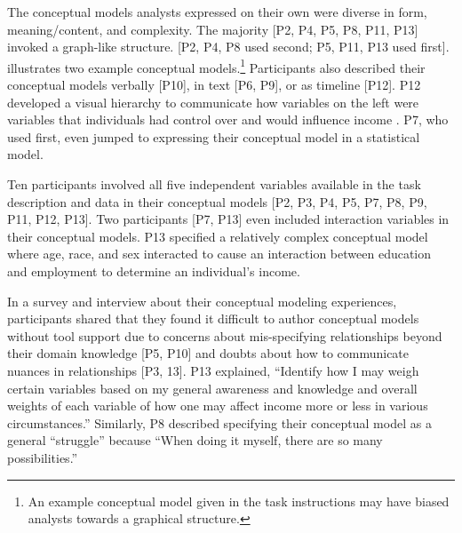 The conceptual models analysts expressed on their own were diverse in form,
meaning/content, and complexity. The majority [P2, P4, P5, P8, P11, P13] invoked
a graph-like structure. [P2, P4, P8 used \rTisane second; P5, P11, P13 used
\rTisane first].  illustrates two example conceptual
models.\footnote{An example conceptual model given in the task instructions may
have biased analysts towards a graphical structure.} Participants also described
their conceptual models verbally [P10], in text [P6, P9], or as timeline [P12].
P12 developed a visual hierarchy to communicate how variables on the left were
variables that individuals had control over and would influence income
. P7, who used \rTisane first, even jumped to expressing
their conceptual model in a statistical model. 

Ten participants involved all five independent variables available in the task
description and data in their conceptual models [P2, P3, P4, P5, P7, P8, P9,
P11, P12, P13]. Two participants [P7, P13] even included interaction variables
in their conceptual models. P13 specified a relatively complex conceptual model
 where age, race, and sex interacted to cause an
interaction between education and employment to determine an individual’s
income. 

In a survey and interview about their conceptual modeling experiences,
participants shared that they found it difficult to author conceptual models
without tool support due to concerns about mis-specifying relationships beyond
their domain knowledge [P5, P10] and doubts about how to communicate nuances in
relationships [P3, 13]. P13 explained, ``Identify how I may weigh certain
variables based on my general awareness and knowledge and overall weights of
each variable of how one may affect income more or less in various
circumstances.'' Similarly, P8 described specifying their conceptual model as a
general ``struggle'' because ``When doing it myself, there are so many
possibilities.''

